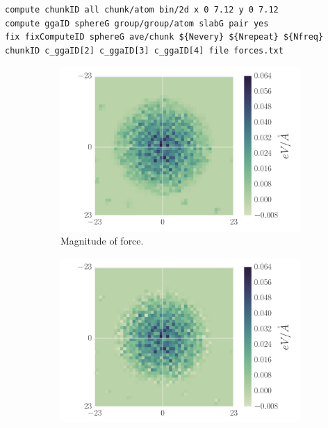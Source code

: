 \documentclass[twoside,english]{uiofysmaster}
\begin{document}
 \begin{lstlisting}[language=LammpsInput, caption={Example usage of compute group/group/atom with spatial binning and time averaging.}, label={lst:usingCustomCompute} ]
compute chunkID all chunk/atom bin/2d x 0 7.12 y 0 7.12
compute ggaID sphereG group/group/atom slabG pair yes
fix fixComputeID sphereG ave/chunk ${Nevery} ${Nrepeat} ${Nfreq} chunkID c_ggaID[2] c_ggaID[3] c_ggaID[4] file forces.txt
\end{lstlisting}

\begin{figure}[H]
	\centering
	\begin{subfigure}{0.49\textwidth}
		\centering
		\includegraphics[width=\linewidth,  trim={15mm 2mm 7mm 2mm}, clip]{figures/forceDistribution/forces/absoluteForceDistribution.pdf}
		\vspace{-7mm}
		\caption{Magnitude of force.}
		\label{fig:absoluteDistribution}
	\end{subfigure}
	\begin{subfigure}{0.49\textwidth}
		\includegraphics[width=\linewidth, trim={13mm 2mm 9mm 2mm}, clip]{figures/forceDistribution/forces/zForceDistribution.pdf}

\end{subfigure}
\end{figure}
\end{document}
